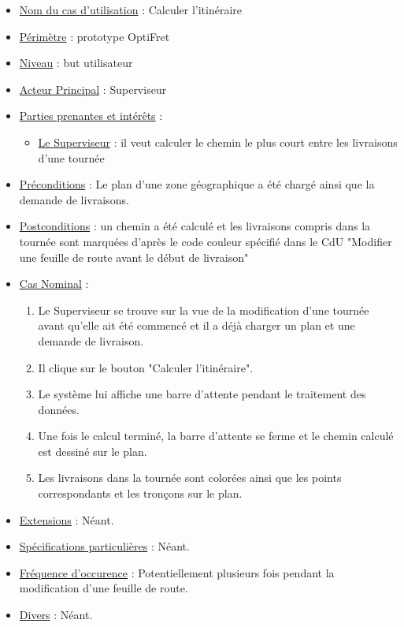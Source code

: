 \documentclass[a4paper, 10pt]{article}
\begin{document}
\begin{itemize}[label = \textbullet, font = \color{orange}]
    \item \underline{Nom du cas d'utilisation} : Calculer l'itinéraire
    \item \underline{Périmètre} : prototype OptiFret
    \item \underline{Niveau} : but utilisateur
    \item \underline{Acteur Principal} : Superviseur
    \item \underline{Parties prenantes et intérêts} :
    \begin{itemize}[label = \textbullet, font = \color{blue}]
        \item \underline{Le Superviseur} : il veut calculer le chemin le plus
            court entre les livraisons d'une tournée
    \end{itemize}
    \item \underline{Préconditions} : Le plan d'une zone géographique a été
        chargé ainsi que la demande de livraisons.
    \item \underline{Postconditions} : un chemin a été calculé et les
        livraisons compris dans la tournée sont marquées d'après le code
        couleur spécifié dans le CdU "Modifier une feuille de route avant le
        début de livraison"
    \item \underline{Cas Nominal} :
    \begin{enumerate}
        \item Le Superviseur se trouve sur la vue de la modification d'une
            tournée avant qu'elle ait été commencé et il a déjà charger un plan
            et une demande de livraison.
        \item Il clique sur le bouton "Calculer l'itinéraire".
        \item Le système lui affiche une barre d'attente pendant le traitement
            des données.
        \item Une fois le calcul terminé, la barre d'attente se ferme et le
            chemin calculé est dessiné sur le plan.
        \item Les livraisons dans la tournée sont colorées ainsi que les points
            correspondants et les tronçons sur le plan.
    \end{enumerate}
    \item \underline{Extensions} : Néant.
    \item \underline{Spécifications particulières} : Néant.
    \item \underline{Fréquence d'occurence} : Potentiellement plusieurs fois
        pendant la modification d'une feuille de route.
    \item \underline{Divers} : Néant.
\end{itemize}
\end{document}

